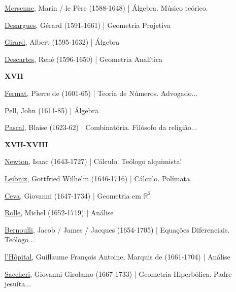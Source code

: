 \documentclass[12pt,a4paper]{article}
\begin{document}
			\href{http://pt.wikipedia.org/wiki/Marin_Mersenne}{Mersenne}, Marin / le Père (1588-1648) | \'Algebra. M\'usico te\'orico.

			\href{http://en.wikipedia.org/wiki/Desargues}{Desargues}, G\'erard (1591-1661) | Geometria Projetiva

			\href{http://en.wikipedia.org/wiki/Albert_Girard}{Girard}, Albert (1595-1632) | \'Algebra

			\href{http://pt.wikipedia.org/wiki/Ren\%C3\%A9_Descartes}{Descartes}, Ren\'e (1596-1650) | Geometria Anal\'itica

			\begin{flushright}
			\end{flushright}

			\textbf{XVII}

			\href{http://pt.wikipedia.org/wiki/Pierre_de_Fermat}{Fermat}, Pierre de (1601-65) | Teoria de N\'umeros. Advogado...

			\href{http://en.wikipedia.org/wiki/John_Pell}{Pell}, John (1611-85) | \'Algebra

			\href{http://pt.wikipedia.org/wiki/Blaise_Pascal}{Pascal}, Blaise (1623-62) | Combinat\'oria. Fil\'osofo da religi\~ao...

			\begin{flushright}
			\end{flushright}

			\textbf{XVII-XVIII}

			\href{http://pt.wikipedia.org/wiki/Isaac_Newton}{Newton}, Isaac (1643-1727) | C\'alculo. Te\'ologo alquimista!

			\href{http://pt.wikipedia.org/wiki/Gottfried_Leibniz}{Leibniz}, Gottfried Wilhelm (1646-1716) | C\'alculo. Pol\'imata.

			\href{http://en.wikipedia.org/wiki/Giovanni_Ceva}{Ceva}, Giovanni (1647-1734) | Geometria em $ \mathbb{R}^2 $

			\href{http://en.wikipedia.org/wiki/Michel_Rolle}{Rolle}, Michel (1652-1719) | An\'alise

			\href{http://pt.wikipedia.org/wiki/Jakob_Bernoulli}{Bernoulli}, Jacob / James / Jacques (1654-1705) | Equa\c{c}\~oes Diferenciais. Te\'ologo...

			\href{http://pt.wikipedia.org/wiki/Guillaume_Fran\%C3\%A7ois_Antoine,_Marqu\%C3\%AAs_de_l\%27H\%C3\%B4pital}{l'H\^opital}, Guillaume Fran\c{c}ois Antoine, Marquis de (1661-1704) | An\'alise

			\href{http://en.wikipedia.org/wiki/Saccheri}{Saccheri}, Giovanni Girolamo (1667-1733) | Geometria Hiperb\'olica. Padre jesu\'ita...
\end{document}
